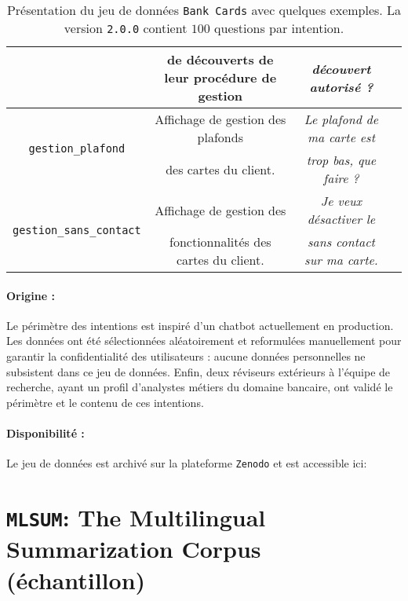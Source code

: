 \begin{table}[!htb]
\begin{center}
\begin{scriptsize}
\begin{tabular}{|c|c|c|c|}
					& de découverts de leur procédure de gestion
					& \textit{découvert autorisé ?}
					\tabularnewline
					\hline
				\multirow{2}{*}{\texttt{gestion\_plafond}}
					& Affichage de gestion des plafonds
					& \textit{Le plafond de ma carte est}
					\tabularnewline
					& des cartes du client.
					& \textit{trop bas, que faire ?}
					\tabularnewline
					\hline
				\multirow{2}{*}{\texttt{gestion\_sans\_contact}}
					& Affichage de gestion des
					& \textit{Je veux désactiver le}
					\tabularnewline
					& fonctionnalités des cartes du client.
					& \textit{sans contact sur ma carte.}
					\tabularnewline
					\hline
			\end{tabular}
			\end{scriptsize}
			\end{center}
			\caption{
				Présentation du jeu de données \texttt{Bank Cards} avec quelques exemples.
				La version \texttt{2.0.0} contient $100$ questions par intention.
			}
			\label{table:A.1-DATASET-BANK-CARDS}
		\end{table}
		
		\paragraph{Origine :}
		Le périmètre des intentions est inspiré d'un chatbot actuellement en production.
		Les données ont été sélectionnées aléatoirement et reformulées manuellement pour garantir la confidentialité des utilisateurs : aucune données personnelles ne subsistent dans ce jeu de données.
		Enfin, deux réviseurs extérieurs à l'équipe de recherche, ayant un profil d'analystes métiers du domaine bancaire, ont validé le périmètre et le contenu de ces intentions.
		
		\paragraph{Disponibilité :}
		Le jeu de données est archivé sur la plateforme \texttt{Zenodo} et est accessible ici: \cite{schild:2022:french-trainset-chatbots}
	

	\section{\texttt{MLSUM}: The Multilingual Summarization Corpus (échantillon)}
	\label{annex:A.2-DATASET-MLSUM-SUBSET-SCHILD}
		
